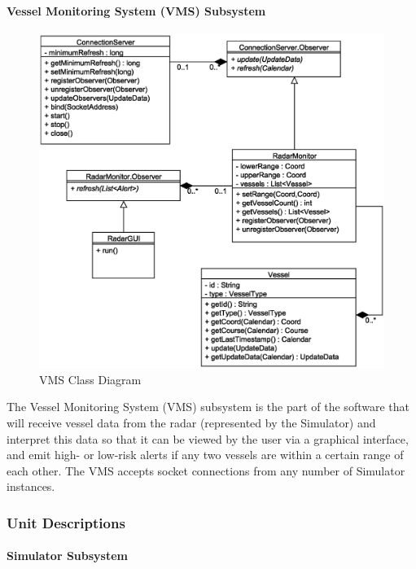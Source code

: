 \documentclass{article}
\begin{document}
\break

\paragraph{Vessel Monitoring System (VMS) Subsystem}

\begin{figure}[!htb]
\caption{VMS Class Diagram}
\centering
\includegraphics[scale=0.6]{diagrams/vms-class-diagram.eps}
\end{figure}

The Vessel Monitoring System (VMS) subsystem is the part of the software that will receive vessel data from the radar (represented by the Simulator) and interpret this data so that it can be viewed by the user via a graphical interface, and emit high- or low-risk alerts if any two vessels are within a certain range of each other. The VMS accepts socket connections from any number of Simulator instances.

\break

\subsubsection{Unit Descriptions} %

\paragraph{Simulator Subsystem}
\end{document}
